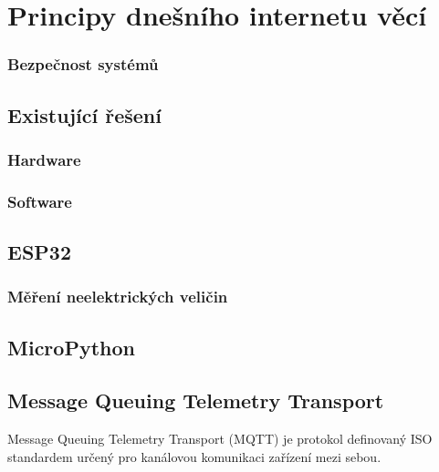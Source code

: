 \chapter{Principy dnešního internetu věcí}
\label{ch:principy-iot}




\subsection{Bezpečnost systémů}


\section{Existující řešení}
\subsection{Hardware}

\subsection{Software}

\section{ESP32}

\subsection{Měření neelektrických veličin}

\section{MicroPython}

\section{Message Queuing Telemetry Transport}
Message Queuing Telemetry Transport (MQTT) je protokol definovaný ISO standardem určený pro kanálovou komunikaci zařízení
mezi sebou. 
